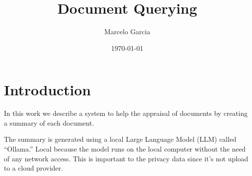 \documentclass[a4paper]{article}
\title{Document Querying}
\author{Marcelo Garcia}
\date{\today}
\begin{document}
\maketitle
\section{Introduction}
In this work we describe a system to help the appraisal of documents by creating a summary of each document.

The summary is generated using a local Large Language Model (LLM) called ``Ollama.'' Local because the model runs on the local computer without the need of any network access. This is important to the privacy data since it's not upload to a cloud provider. 
\end{document}

